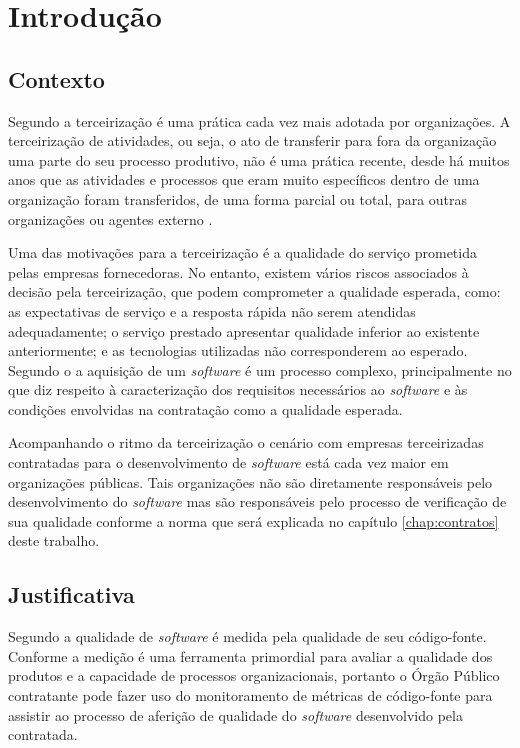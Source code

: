 \chapter{Introdução}
\label{chap:introdução} 

\section{Contexto}

Segundo\cite{WillcocksTercerizacao} a terceirização é uma prática cada vez mais adotada por organizações. A terceirização de atividades, ou seja, o ato de transferir para fora da organização uma parte do seu processo produtivo, não é uma prática recente, desde há muitos anos que as atividades e processos que eram muito específicos dentro de uma organização foram transferidos, de uma forma parcial ou total, para outras organizações ou agentes externo \cite{leite_terceirizacao}.

Uma das motivações para a terceirização é a qualidade do serviço prometida pelas empresas fornecedoras. No entanto, existem vários riscos associados à decisão pela terceirização, que podem comprometer a qualidade esperada, como: as expectativas de serviço e a resposta rápida não serem atendidas adequadamente; o serviço prestado apresentar qualidade inferior ao existente anteriormente; e as tecnologias utilizadas não corresponderem ao esperado\cite{WillcocksTercerizacao}. Segundo o \cite{GuiaAquisicao} a aquisição de um \textit {software} é um processo complexo, principalmente no que diz respeito à caracterização dos requisitos necessários ao \textit {software} e às condições envolvidas na contratação como a qualidade esperada. 
 
Acompanhando o ritmo da terceirização o cenário com empresas terceirizadas contratadas para o desenvolvimento de \textit {software} está cada vez maior em organizações públicas. Tais organizações não são diretamente responsáveis pelo desenvolvimento do \textit {software} mas são responsáveis  pelo processo de verificação de sua qualidade conforme a norma  que será explicada no capítulo \ref{chap:contratos} deste trabalho.


\section{Justificativa}

Segundo \cite{beck1999}\cite{fowler1999refactoring} a qualidade de \textit{software} é medida pela qualidade de seu código-fonte. Conforme a \cite{ISO:15939} medição é uma ferramenta primordial para avaliar a qualidade dos produtos e a capacidade de processos organizacionais, portanto o Órgão Público contratante pode fazer uso do monitoramento de métricas de código-fonte para assistir ao processo de aferição de qualidade do \textit{software} desenvolvido pela contratada.

